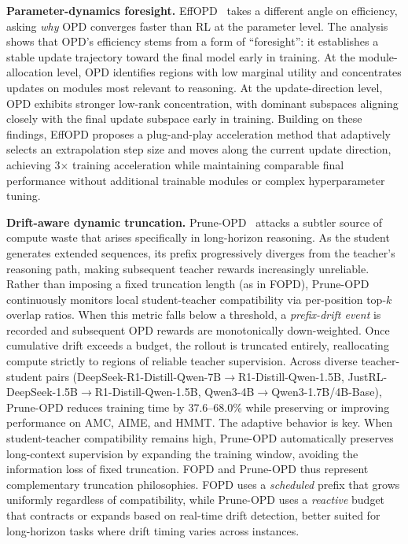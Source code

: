 \documentclass{article} %
\begin{document}
\textbf{Parameter-dynamics foresight.} EffOPD~\citep{2605.11739} takes a different angle on efficiency, asking \emph{why} OPD converges faster than RL at the parameter level. The analysis shows that OPD's efficiency stems from a form of ``foresight'': it establishes a stable update trajectory toward the final model early in training. At the module-allocation level, OPD identifies regions with low marginal utility and concentrates updates on modules most relevant to reasoning. At the update-direction level, OPD exhibits stronger low-rank concentration, with dominant subspaces aligning closely with the final update subspace early in training. Building on these findings, EffOPD proposes a plug-and-play acceleration method that adaptively selects an extrapolation step size and moves along the current update direction, achieving 3$\times$ training acceleration while maintaining comparable final performance without additional trainable modules or complex hyperparameter tuning.

\textbf{Drift-aware dynamic truncation.} Prune-OPD~\citep{2605.07804} attacks a subtler source of compute waste that arises specifically in long-horizon reasoning. As the student generates extended sequences, its prefix progressively diverges from the teacher's reasoning path, making subsequent teacher rewards increasingly unreliable. Rather than imposing a fixed truncation length (as in FOPD), Prune-OPD continuously monitors local student-teacher compatibility via per-position top-$k$ overlap ratios. When this metric falls below a threshold, a \emph{prefix-drift event} is recorded and subsequent OPD rewards are monotonically down-weighted. Once cumulative drift exceeds a budget, the rollout is truncated entirely, reallocating compute strictly to regions of reliable teacher supervision. Across diverse teacher-student pairs (DeepSeek-R1-Distill-Qwen-7B$\to$R1-Distill-Qwen-1.5B, JustRL-DeepSeek-1.5B$\to$R1-Distill-Qwen-1.5B, Qwen3-4B$\to$Qwen3-1.7B/4B-Base), Prune-OPD reduces training time by 37.6--68.0\% while preserving or improving performance on AMC, AIME, and HMMT. The adaptive behavior is key. When student-teacher compatibility remains high, Prune-OPD automatically preserves long-context supervision by expanding the training window, avoiding the information loss of fixed truncation. FOPD and Prune-OPD thus represent complementary truncation philosophies. FOPD uses a \emph{scheduled} prefix that grows uniformly regardless of compatibility, while Prune-OPD uses a \emph{reactive} budget that contracts or expands based on real-time drift detection, better suited for long-horizon tasks where drift timing varies across instances.
\end{document}
